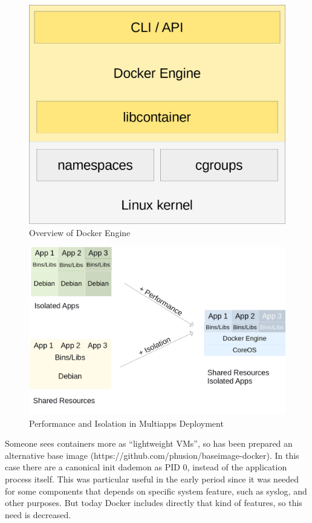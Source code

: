\begin{figure}[htbp]
\centering
\includegraphics{media/ch3-docker.png}
\caption{Overview of Docker Engine}
\end{figure}

\begin{figure}[htbp]
\centering
\includegraphics{media/ch3-docker_multiapps.png}
\caption{Performance and Isolation in Multiapps Deployment}
\end{figure}

Someone sees containers more as ``lightweight VMs'', so has been
prepared an alternative base image
(https://github.com/phusion/baseimage-docker). In this case there are a
canonical init dademon as PID 0, instead of the application process
itself. This was particular useful in the early period since it was
needed for some components that depends on specific system feature, such
as syslog, and other purposes. But today Docker includes directly that
kind of features, so this need is decreased.

